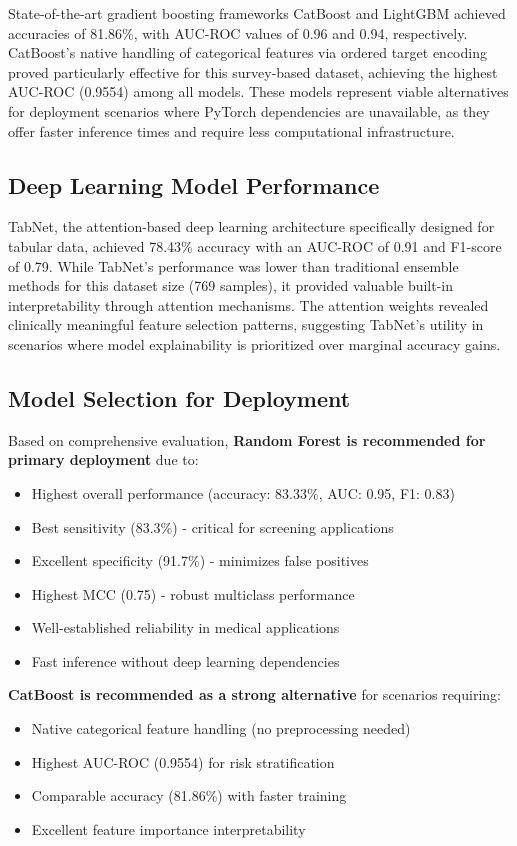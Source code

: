 State-of-the-art gradient boosting frameworks CatBoost and LightGBM achieved accuracies of 81.86\%, with AUC-ROC values of 0.96 and 0.94, respectively. CatBoost's native handling of categorical features via ordered target encoding proved particularly effective for this survey-based dataset, achieving the highest AUC-ROC (0.9554) among all models. These models represent viable alternatives for deployment scenarios where PyTorch dependencies are unavailable, as they offer faster inference times and require less computational infrastructure.

\subsection{Deep Learning Model Performance}

TabNet, the attention-based deep learning architecture specifically designed for tabular data, achieved 78.43\% accuracy with an AUC-ROC of 0.91 and F1-score of 0.79. While TabNet's performance was lower than traditional ensemble methods for this dataset size (769 samples), it provided valuable built-in interpretability through attention mechanisms. The attention weights revealed clinically meaningful feature selection patterns, suggesting TabNet's utility in scenarios where model explainability is prioritized over marginal accuracy gains.

\subsection{Model Selection for Deployment}

Based on comprehensive evaluation, \textbf{Random Forest is recommended for primary deployment} due to:
\begin{itemize}
    \item Highest overall performance (accuracy: 83.33\%, AUC: 0.95, F1: 0.83)
    \item Best sensitivity (83.3\%) - critical for screening applications
    \item Excellent specificity (91.7\%) - minimizes false positives
    \item Highest MCC (0.75) - robust multiclass performance
    \item Well-established reliability in medical applications
    \item Fast inference without deep learning dependencies
\end{itemize}

\textbf{CatBoost is recommended as a strong alternative} for scenarios requiring:
\begin{itemize}
    \item Native categorical feature handling (no preprocessing needed)
    \item Highest AUC-ROC (0.9554) for risk stratification
    \item Comparable accuracy (81.86\%) with faster training
    \item Excellent feature importance interpretability
\end{itemize}

